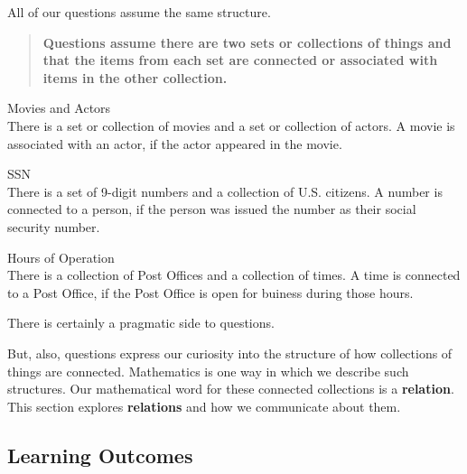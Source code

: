 \documentclass{ximera}
\begin{document}
All of our questions assume the same structure.  \\


\begin{quote} 
\textbf{\textcolor{green!50!black}{Questions assume there are two sets or collections of things and that the items from each set are connected or associated with items in the other collection.}} 
\end{quote}


\begin{example} Movies and Actors \\
There is a set or collection of movies and a set or collection of actors.  A movie is associated with an actor, if the actor appeared in the movie.
\end{example}

\begin{example} SSN \\
There is a set of 9-digit numbers and a collection of U.S. citizens.  A number is connected to a person, if the person was issued the number as their social security number.
\end{example}

\begin{example} Hours of Operation \\
There is a collection of Post Offices and a collection of times.  A time is connected to a Post Office, if the Post Office is open for buiness during those hours.
\end{example}

There is certainly a pragmatic side to questions.


But, also, questions express our curiosity into the structure of how collections of things are connected. Mathematics is one way in which we describe such structures. Our mathematical word for these connected collections is a \textbf{\textcolor{blue!75!black}{relation}}. \\


This section explores \textbf{\textcolor{blue!75!black}{relations}} and how we communicate about them. \\










\subsection{Learning Outcomes}
\end{document}
